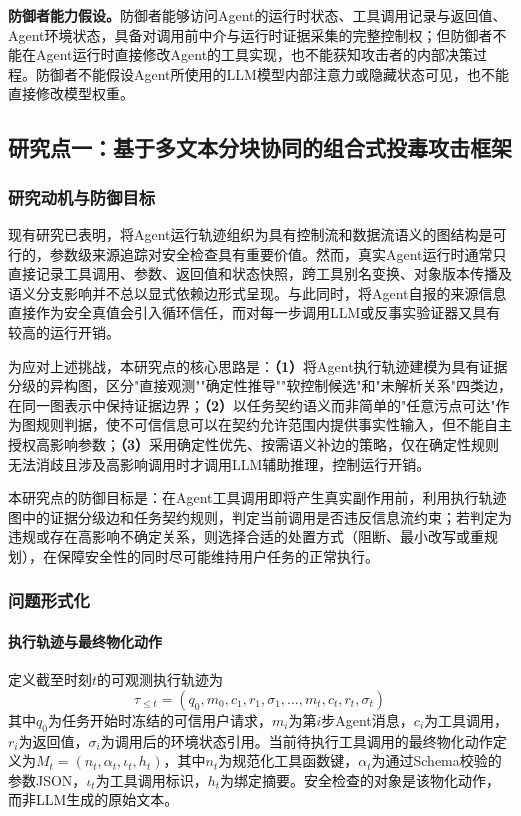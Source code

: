 \textbf{防御者能力假设。}防御者能够访问Agent的运行时状态、工具调用记录与返回值、Agent环境状态，具备对调用前中介与运行时证据采集的完整控制权；但防御者不能在Agent运行时直接修改Agent的工具实现，也不能获知攻击者的内部决策过程。防御者不能假设Agent所使用的LLM模型内部注意力或隐藏状态可见，也不能直接修改模型权重。

\subsection{研究点一：基于多文本分块协同的组合式投毒攻击框架}

\subsubsection{研究动机与防御目标}

现有研究已表明，将Agent运行轨迹组织为具有控制流和数据流语义的图结构是可行的\cite{wang2025agentarmor}，参数级来源追踪对安全检查具有重要价值\cite{fan2026granularity,zhang2026agentsentry}。然而，真实Agent运行时通常只直接记录工具调用、参数、返回值和状态快照，跨工具别名变换、对象版本传播及语义分支影响并不总以显式依赖边形式呈现。与此同时，将Agent自报的来源信息直接作为安全真值会引入循环信任，而对每一步调用LLM或反事实验证器又具有较高的运行开销。

为应对上述挑战，本研究点的核心思路是：\textbf{（1）}将Agent执行轨迹建模为具有证据分级的异构图，区分"直接观测""确定性推导""软控制候选"和"未解析关系"四类边，在同一图表示中保持证据边界；\textbf{（2）}以任务契约语义而非简单的"任意污点可达"作为图规则判据，使不可信信息可以在契约允许范围内提供事实性输入，但不能自主授权高影响参数；\textbf{（3）}采用确定性优先、按需语义补边的策略，仅在确定性规则无法消歧且涉及高影响调用时才调用LLM辅助推理，控制运行开销。

本研究点的防御目标是：在Agent工具调用即将产生真实副作用前，利用执行轨迹图中的证据分级边和任务契约规则，判定当前调用是否违反信息流约束；若判定为违规或存在高影响不确定关系，则选择合适的处置方式（阻断、最小改写或重规划），在保障安全性的同时尽可能维持用户任务的正常执行。

\subsubsection{问题形式化}

\paragraph{执行轨迹与最终物化动作}
定义截至时刻$t$的可观测执行轨迹为
\begin{equation}
  \tau_{\le t} = (q_0, m_0, c_1, r_1, \sigma_1, \ldots, m_t, c_t, r_t, \sigma_t)
  \label{eq:trajectory}
\end{equation}
其中$q_0$为任务开始时冻结的可信用户请求，$m_i$为第$i$步Agent消息，$c_i$为工具调用，$r_i$为返回值，$\sigma_i$为调用后的环境状态引用。当前待执行工具调用的最终物化动作定义为$M_t=(n_t, \alpha_t, \iota_t, h_t)$，其中$n_t$为规范化工具函数键，$\alpha_t$为通过Schema校验的参数JSON，$\iota_t$为工具调用标识，$h_t$为绑定摘要。安全检查的对象是该物化动作，而非LLM生成的原始文本。

